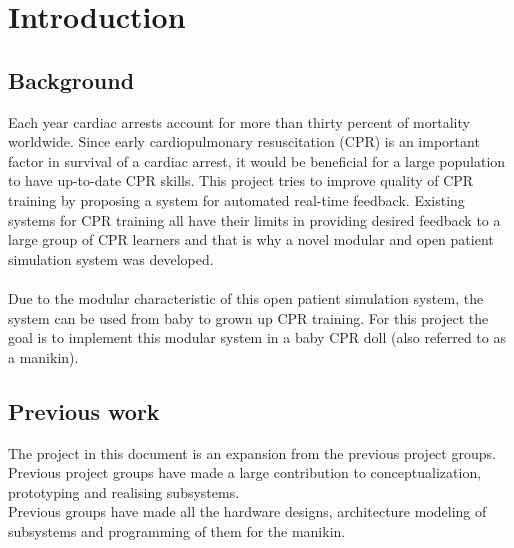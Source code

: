 \chapter{Introduction}
\label{chapter:intro}

\section{Background}
Each year cardiac arrests account for more than thirty percent of mortality worldwide. Since
early cardiopulmonary resuscitation (CPR) is an important factor in survival of a cardiac arrest,
it would be beneficial for a large population to have up-to-date CPR skills. This project tries to
improve quality of CPR training by proposing a system for automated real-time feedback.
Existing systems for CPR training all have their limits in providing desired feedback to a large
group of CPR learners and that is why a novel modular and open patient simulation system was
developed. \cite{jakortenmsc}\\\\
Due to the modular characteristic of this open patient simulation system, the system can be used from baby to grown up CPR training. 
For this project the goal is to implement this modular system in a baby CPR doll (also referred to as a manikin).\\
\section{Previous work}
The project in this document is an expansion from the previous project groups. Previous project groups have made a large contribution to conceptualization, prototyping and realising subsystems. \\
Previous groups have made all the hardware designs, architecture modeling of subsystems and programming of them for the manikin.\\ 
